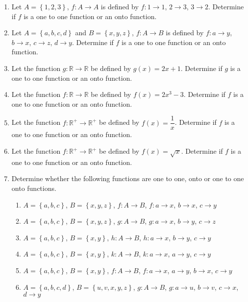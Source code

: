 \documentclass[12pt]{report}
\begin{document}
\begin{multicols}{2}

  \begin{enumerate}
    \item Let $A = \left\{1, 2, 3\right\}$, $f: A \to A$ is defined by $f: 1 \to 1$, $2
            \to 3$, $3 \to 2$. Determine if $f$ is a one to one function or an onto
          function.

    \item Let $A = \left\{a, b, c, d\right\}$ and $B = \left\{x, y, z\right\}$, $f: A \to
            B$ is defined by $f: a \to y$, $b \to x$, $c \to z$, $d \to y$. Determine if
          $f$ is a one to one function or an onto function.

    \item Let the function $g: \mathbb{R} \to \mathbb{R}$ be defined by $g(x) = 2x + 1$.
          Determine if $g$ is a one to one function or an onto function.

    \item Let the function $f: \mathbb{R} \to \mathbb{R}$ be defined by $f(x) = 2x^3 -
            3$. Determine if $f$ is a one to one function or an onto function.

    \item Let the function $f: \mathbb{R}^+ \to \mathbb{R}^+$ be defined by $f(x) =
            \dfrac{1}{x}$. Determine if $f$ is a one to one function or an onto function.

    \item Let the function $f: \mathbb{R}^+ \to \mathbb{R}^+$ be defined by $f(x) =
            \sqrt{x}$. Determine if $f$ is a one to one function or an onto function.

    \item Determine whether the following functions are one to one, onto or one to one
          onto functions.
          \begin{enumerate}
            \item $A = \left\{a, b, c\right\}$, $B = \left\{x, y, z\right\}$, $f: A \to
                    B$, $f: a \to x$, $b \to x$, $c \to y$
            \item $A = \left\{a, b, c\right\}$, $B = \left\{x, y, z\right\}$, $g: A \to
                    B$, $g: a \to x$, $b \to y$, $c \to z$
            \item $A = \left\{a, b, c\right\}$, $B = \left\{x, y\right\}$, $h: A \to
                    B$, $h: a \to x$, $b \to y$, $c \to y$
            \item $A = \left\{a, b, c\right\}$, $B = \left\{x, y\right\}$, $k: A \to
                    B$, $k: a \to x$, $a \to y$, $c \to y$
            \item $A = \left\{a, b, c\right\}$, $B = \left\{x, y\right\}$, $f: A \to B$, $f: a \to x$, $a \to y$, $b \to x$, $c \to y$
            \item $A = \left\{a, b, c, d\right\}$, $B = \left\{u, v, x, y, z\right\}$, $g: A \to B$, $g: a \to u$, $b \to v$, $c \to x$, $d \to y$
          \end{enumerate}


\end{enumerate}
\end{multicols}
\end{document}
